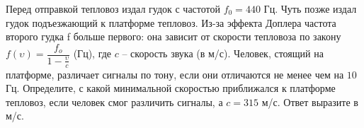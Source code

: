 \begin{ex}
	\begin{condition}
		Перед отправкой тепловоз издал гудок с частотой \( f_0 = 440 \) Гц. Чуть позже издал гудок подъезжающий к платформе тепловоз. Из-за эффекта Доплера частота второго гудка f больше первого: она зависит от скорости тепловоза по закону \( f(\upsilon )=\dfrac{f_o}{1-\frac{\upsilon}{c}} \) (Гц), где \( c \) -- скорость звука (в м/с). Человек, стоящий на платформе, различает сигналы по тону, если они отличаются не менее чем на \( 10 \) Гц. Определите, с какой минимальной скоростью приближался к платформе тепловоз, если человек смог различить сигналы, а \( c = 315 \) м/с. Ответ выразите в м/с.
	\end{condition}
\end{ex}